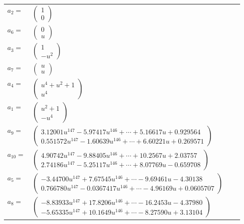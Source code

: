 \documentclass[1p]{elsarticle_modified}
\theoremstyle{definition}
\begin{document}
\begin{tabular}{m{7pt} m{180pt} m{7pt} m{180pt} }
\flushright $a_{2}=$&$\begin{pmatrix}1\\0\end{pmatrix}$ \\
\flushright $a_{6}=$&$\begin{pmatrix}0\\u\end{pmatrix}$ \\
\flushright $a_{3}=$&$\begin{pmatrix}1\\- u^2\end{pmatrix}$ \\
\flushright $a_{7}=$&$\begin{pmatrix}u\\u\end{pmatrix}$ \\
\flushright $a_{4}=$&$\begin{pmatrix}u^4+u^2+1\\u^4\end{pmatrix}$ \\
\flushright $a_{1}=$&$\begin{pmatrix}u^2+1\\- u^4\end{pmatrix}$ \\
\flushright $a_{9}=$&$\begin{pmatrix}3.12001 u^{147}-5.97417 u^{146}+\cdots+5.16617 u+0.929564\\0.551572 u^{147}-1.60639 u^{146}+\cdots+6.60221 u+0.269571\end{pmatrix}$ \\
\flushright $a_{10}=$&$\begin{pmatrix}4.90742 u^{147}-9.88405 u^{146}+\cdots+10.2567 u+2.03757\\2.74186 u^{147}-5.25117 u^{146}+\cdots+8.07769 u-0.659708\end{pmatrix}$ \\
\flushright $a_{5}=$&$\begin{pmatrix}-3.44700 u^{147}+7.67545 u^{146}+\cdots-9.69461 u-4.30138\\0.766780 u^{147}-0.0367417 u^{146}+\cdots-4.96169 u+0.0605707\end{pmatrix}$ \\
\flushright $a_{8}=$&$\begin{pmatrix}-8.83933 u^{147}+17.8206 u^{146}+\cdots-16.2453 u-4.37980\\-5.65335 u^{147}+10.1649 u^{146}+\cdots-8.27590 u+3.13104\end{pmatrix}$ \\

\end{tabular}
\end{document}
